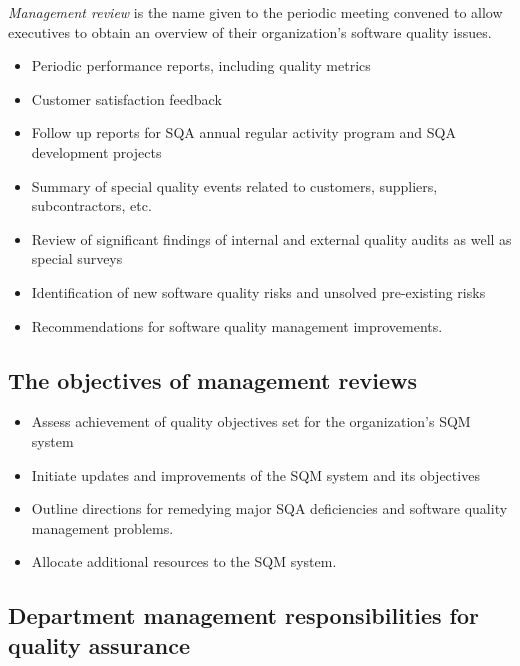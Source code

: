 \documentclass{article}
\begin{document}
\begin{flushleft}
\textit{Management review} is the name given to the periodic meeting convened to allow executives to obtain an overview of their organization’s software quality issues.
\begin{itemize}
  \item Periodic performance reports, including quality metrics
  \item Customer satisfaction feedback
  \item Follow up reports for SQA annual regular activity program and SQA development projects
  \item Summary of special quality events related to customers, suppliers, subcontractors, etc.
  \item Review of significant findings of internal and external quality audits as well as special surveys
  \item Identification of new software quality risks and unsolved pre-existing risks
  \item Recommendations for software quality management improvements.
\end{itemize}
\end{flushleft}

\subsection{The objectives of management reviews}

\begin{itemize}
  \item Assess achievement of quality objectives set for the organization’s SQM system
  \item Initiate updates and improvements of the SQM system and its objectives
  \item Outline directions for remedying major SQA deficiencies and software quality management problems.
  \item Allocate additional resources to the SQM system.
\end{itemize}

\subsection{Department management responsibilities for quality assurance}
\end{document}
